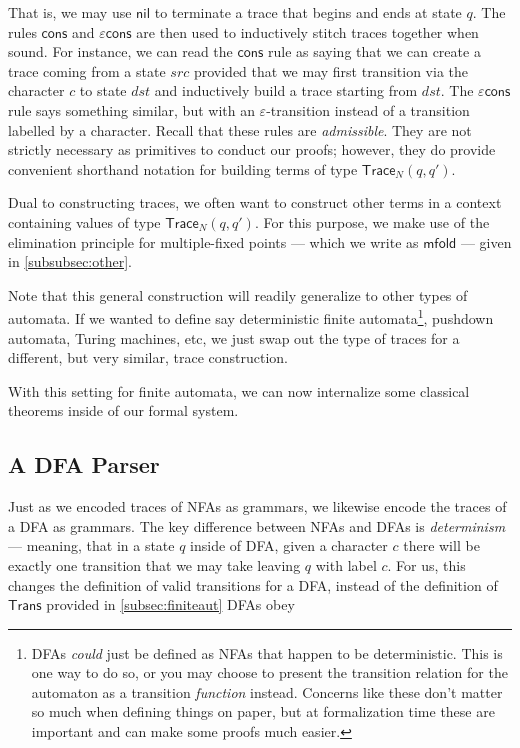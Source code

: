 \documentclass[acmsmall,screen,nonacm]{acmart}
\begin{document}
That is, we may use $\mathsf{nil}$ to terminate a trace that
begins and ends at state $q$. The rules $\mathsf{cons}$ and
$\mathsf{\varepsilon cons}$ are then used to inductively
stitch traces together when sound. For instance, we can read
the $\mathsf{cons}$ rule as saying that we can
create a trace coming from a state $src$ provided that we may first
transition via the character $c$ to state $dst$ and
inductively build a trace starting from $dst$. The
$\mathsf{\varepsilon cons}$ rule says something similar, but
with an $\varepsilon$-transition instead of a transition
labelled by a character. Recall that
these rules are \emph{admissible}. They are not strictly
necessary as primitives to conduct our proofs; however, they
do provide convenient shorthand notation for building terms
of type $\mathsf{Trace}_{N}(q , q')$.

Dual to constructing traces, we often want to construct
other terms in a context containing values of type
$\mathsf{Trace}_{N}(q , q')$. For this purpose, we make use
of the elimination principle for multiple-fixed points ---
which we write as $\mathsf{mfold}$ --- given
in \cref{subsubsec:other}.

Note that this general construction will readily generalize to other types of
automata. If we wanted to define say deterministic finite automata\footnote{DFAs
\emph{could} just be defined as NFAs that happen to be deterministic. This is
one way to do so, or you may choose to present the transition relation for the
automaton as a transition \emph{function} instead. Concerns like these don't
matter so much when defining things on paper, but at formalization time these
are important and can make some proofs much easier.}, pushdown automata, Turing
machines, etc, we just swap out the type of traces for a different, but very
similar, trace construction.

With this setting for finite automata, we can now internalize some classical theorems inside of our formal system.


\subsection{A DFA Parser}
\label{subsec:regexparser}

Just as we encoded traces of NFAs as grammars, we likewise
encode the traces of a DFA as grammars. The key difference
between NFAs and DFAs is \emph{determinism} --- meaning,
that in a state $q$ inside of DFA, given a character $c$ there
will be exactly one transition that we may take leaving $q$
with label $c$. For us, this changes the definition of valid
transitions for a DFA, instead of the definition of
$\mathsf{Trans}$ provided in \cref{subsec:finiteaut} DFAs
obey
\end{document}
